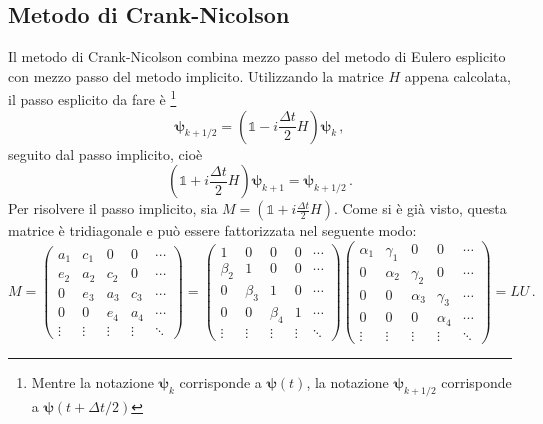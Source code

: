 \documentclass[a4paper, titlepage]{article}
\numberwithin{equation}{section}
\begin{document}
\subsection{Metodo di Crank-Nicolson}
Il metodo di Crank-Nicolson combina mezzo passo del metodo di Eulero esplicito con mezzo passo del metodo implicito. Utilizzando la matrice $H$ appena calcolata, il passo esplicito da fare è \footnote{Mentre la notazione $\bm{\psi}_k$ corrisponde a $\bm{\psi}(t)$, la notazione $\bm{\psi}_{k+1/2}$ corrisponde a $\bm{\psi}(t+\Delta t/2)$}
\begin{equation*}
    \bm{\psi}_{k+1/2} = \left(\mathbb{1} - i\frac{\Delta t}{2} H\right)\bm{\psi}_k\, ,
\end{equation*}
seguito dal passo implicito, cioè
\begin{equation*}
    \left(\mathbb{1} + i\frac{\Delta t}{2} H\right)\bm{\psi}_{k+1} = \bm{\psi}_{k+1/2}\, .
\end{equation*}
Per risolvere il passo implicito, sia $M = \left(\mathbb{1} + i\frac{\Delta t}{2} H\right)$. Come si è già visto, questa matrice è tridiagonale e può essere fattorizzata nel seguente modo:
\begin{equation*} 
    M = 
    \begin{pmatrix}
        a_1 & c_1 & 0 & 0 & \cdots \\
        e_2 & a_2 & c_2 & 0 & \cdots \\
        0 & e_3 & a_3 & c_3 & \cdots \\
        0 & 0 & e_4 & a_4 & \cdots \\
        \vdots & \vdots & \vdots & \vdots & \ddots 
    \end{pmatrix} = 
    \begin{pmatrix}
        1 & 0 & 0 & 0 & \cdots \\
        \beta_2 & 1 & 0 & 0 & \cdots \\
        0 & \beta_3 & 1 & 0 & \cdots \\
        0 & 0 & \beta_4 & 1 & \cdots \\
        \vdots & \vdots & \vdots & \vdots & \ddots 
    \end{pmatrix}
    \begin{pmatrix}
        \alpha_1 & \gamma_1 & 0 & 0 & \cdots \\
        0 & \alpha_2 & \gamma_2 & 0 & \cdots \\
        0 & 0 & \alpha_3 & \gamma_3 & \cdots \\
        0 & 0 & 0 & \alpha_4 & \cdots \\
        \vdots & \vdots & \vdots & \vdots & \ddots 
    \end{pmatrix}
    = LU\, .
\end{equation*}
\end{document}
